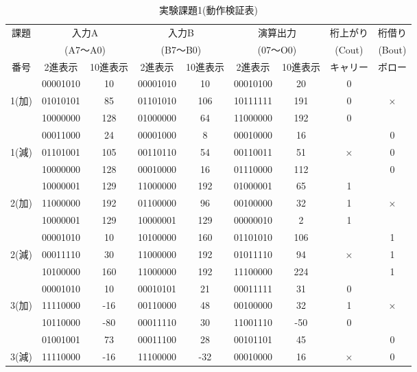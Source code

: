 \documentclass[11pt,a4j]{jsarticle}
\begin{document}
  
  \begin{table}[htb]
  \begin{center}
    \caption{実験課題1(動作検証表)}
    \begin{tabular}{|c|c|c|c|c|c|c|c|c|} \hline
課題 & \multicolumn{2}{|c|}{入力A} & \multicolumn{2}{|c|}{入力B} & \multicolumn{2}{|c|}{演算出力} & 桁上がり & 桁借り\\
 & \multicolumn{2}{|c|}{(A7～A0)} & \multicolumn{2}{|c|}{(B7～B0)} & \multicolumn{2}{|c|}{(07～O0)} & (Cout) & (Bout) \\ \cline{2-7}
番号 & 2進表示 & 10進表示 & 2進表示 & 10進表示 & 2進表示 & 10進表示 & キャリー & ボロー \\ \hline
 & 00001010 & 10 & 00001010 &10  &00010100  & 20 & 0 &  \\ \cline{2-8}
1(加) & 01010101 & 85 & 01101010 &106  &10111111  & 191 & 0 & × \\ \cline{2-8}
 & 10000000 & 128 & 01000000 &64  & 11000000 & 192 & 0 &  \\ \hline
 & 00011000 &24  & 00001000 &8  &00010000  & 16 &  & 0 \\ \cline{2-7}\cline{9-9}
1(減) & 01101001 & 105 &00110110  &54  & 00110011 & 51 & × & 0 \\ \cline{2-7}\cline{9-9}
 & 10000000 & 128 &00010000  & 16 &01110000  & 112 &  & 0 \\ \hline
 & 10000001 & 129 &11000000  & 192 &01000001  &65  & 1 &  \\ \cline{2-8}
2(加) & 11000000 & 192 & 01100000 &96  &00100000  &32  & 1 & × \\ \cline{2-8}
 & 10000001 &  129& 10000001 & 129 &00000010  & 2 & 1 &  \\ \hline
 & 00001010 &10  &10100000  &160  &01101010  &106  &  & 1 \\ \cline{2-7}\cline{9-9}
2(減) & 00011110 &  30& 11000000 & 192 & 01011110 & 94 & × & 1 \\ \cline{2-7}\cline{9-9}
 & 10100000 & 160 &11000000  & 192 & 11100000 &224  &  & 1 \\ \hline
 &00001010  & 10 & 00010101 &21  & 00011111 &31  & 0 &  \\ \cline{2-8}
3(加) & 11110000 &-16  & 00110000 & 48 & 00100000 & 32 & 1 & × \\ \cline{2-8}
 & 10110000 & -80 &00011110  & 30 & 11001110 &-50  & 0 &  \\ \hline
 & 01001001 & 73 & 00011100 &28  & 00101101 &45  &  & 0 \\ \cline{2-7}\cline{9-9}
3(減) & 11110000 & -16 &11100000  & -32 &00010000  &16  & × & 0 \\ \cline{2-7}\cline{9-9}

\end{tabular}
\end{center}
\end{table}
\end{document}
